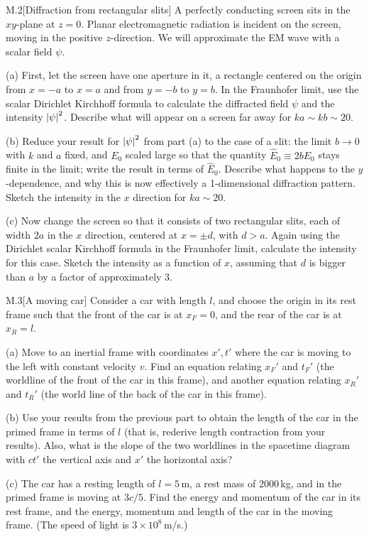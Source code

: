 \documentclass[12pt]{article}
\begin{document}
\begin{problem}{M.2}[Diffraction from rectangular slits]
A perfectly conducting screen sits in the $xy$-plane at $z=0$. Planar
electromagnetic radiation is incident on the screen, moving in the positive
$z$-direction. We will approximate the EM wave with a scalar field $\psi$.

(a) First, let the screen have one aperture in it, a rectangle centered on the
origin from $x=-a$ to $x=a$ and from $y=-b$ to $y=b$. In the Fraunhofer limit,
use the scalar Dirichlet Kirchhoff formula to calculate the diffracted field
$\psi$ and the intensity $\abs{\psi}^2$. Describe what will appear on a screen
far away for $ka\sim kb\sim20$.

(b) Reduce your result for $\abs{\psi}^2$ from part (a) to the case of a slit: 
the limit $b\to0$ with $k$ and $a$ fixed, and $E_0$ scaled large so that the
quantity $\hat{E}_0\equiv 2bE_0$ stays finite in the limit; write the result in
terms of $\hat{E}_0$. Describe what happens to the $y$-dependence, and why this
is now effectively a 1-dimensional diffraction pattern. Sketch the intensity in
the $x$ direction for $ka\sim20$.

(c) Now change the screen so that it consists of two rectangular slits, each of
width $2a$ in the $x$ direction, centered at $x=\pm d$, with $d>a$. Again using
the Dirichlet scalar Kirchhoff formula in the Fraunhofer limit, calculate the
intensity for this case. Sketch the intensity as a function of $x$, assuming
that $d$ is bigger than $a$ by a factor of approximately 3.
\begin{solution}
\end{solution}
\end{problem}
\newpage
\begin{problem}{M.3}[A moving car]
Consider a car with length $l$, and choose the origin in its rest frame such
that the front of the car is at $x_F=0$, and the rear of the car is at $x_R=l$.

(a) Move to an inertial frame with coordinates $x',t'$ where the car is moving
to the left with constant velocity $v$. Find an equation relating $x_F'$ and
$t_F'$ (the worldline of the front of the car in this frame), and another
equation relating $x_R'$ and $t_R'$ (the world line of the back of the car in
this frame).

(b) Use your results from the previous part to obtain the length of the car in
the primed frame in terms of $l$ (that is, rederive length contraction from your
results). Also, what is the slope of the two worldlines in the spacetime diagram
with $ct'$ the vertical axis and $x'$ the horizontal axis?

(c) The car has a resting length of $l=5$\,\si{m}, a rest mass of 2000\,\si{kg},
and in the primed frame is moving at $3c/5$. Find the energy and momentum of the
car in its rest frame, and the energy, momentum and length of the car in the
moving frame. (The speed of light is $3\times10^8$\,\si{m/s}.)
\begin{solution}
\end{solution}
\end{problem}
\newpage
\end{document}
